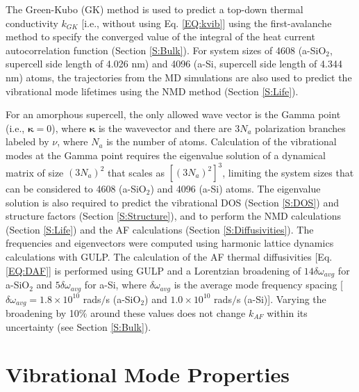 \documentclass[aps,prb,onecolumn,preprint,superscriptaddress,footinbib,amsmath,amssymb,floatfix]{revtex4}
\begin{document}
The Green-Kubo (GK) method is used to predict a top-down thermal 
conductivity $k_{GK}$ [i.e., without using Eq. \eqref{EQ:kvib}]
\cite{mcquarrie_statistical_2000} using the 
first-avalanche method to specify the converged value of the integral 
of the heat current autocorrelation function (Section \ref{S:Bulk}).
\cite{chen_how_2010} 
For system sizes of 4608 (a-SiO$_2$, supercell side length of 4.026 nm) 
and 4096 (a-Si, supercell side length of 4.344 nm) atoms, 
the trajectories from the MD simulations are also used to predict 
the vibrational mode lifetimes using the NMD method 
(Section \ref{S:Life}). 

For an amorphous supercell, 
the only allowed wave vector is the Gamma point 
(i.e., $\pmb{\kappa}=0$),  
where $\pmb{\kappa}$ is the wavevector and there are $3N_a$ 
polarization 
branches labeled by $\nu$, where $N_a$ is the number of atoms. 
Calculation of the vibrational modes at the Gamma point  
requires the eigenvalue solution of a dynamical matrix of size 
$(3N_a)^2$ that scales as $[(3N_a)^2]^3$, limiting the system 
sizes that can be considered to 4608 (a-SiO$_2$) and 4096 (a-Si) 
atoms. 
The eigenvalue solution is also required to predict the vibrational 
DOS (Section \ref{S:DOS}) and structure factors 
(Section \ref{S:Structure}), and to perform the NMD calculations  
(Section \ref{S:Life})  
and the AF calculations (Section \ref{S:Diffusivities}). 
The frequencies and eigenvectors were computed using harmonic
lattice dynamics calculations with GULP.\cite{gale_general_2003} 
The calculation of the AF thermal diffusivities 
[Eq. \eqref{EQ:DAF}] is performed using GULP and a Lorentzian 
broadening of $14\delta\omega_{avg}$ for a-SiO$_2$ and 
$5\delta\omega_{avg}$ for a-Si, 
where $\delta\omega_{avg}$ is the average mode 
frequency spacing 
[$\delta\omega_{avg} = 1.8 \times 10^{10}$ rads$/$s (a-SiO$_2$) 
and $1.0 \times 10^{10}$ rads$/$s (a-Si)].
\cite{feldman_thermal_1993,feldman_numerical_1999}  
Varying the broadening by 10$\%$ around these values does not 
change $k_{AF}$ within its uncertainty 
(see Section \ref{S:Bulk}).

\section{\label{S:Vibrational}Vibrational Mode Properties}

\end{document}
